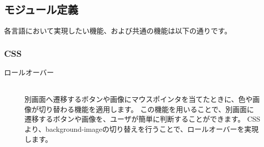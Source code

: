 \documentclass[a4j,titlepage]{jarticle}
\begin{document}
\clearpage

\subsection{モジュール定義}
各言語において実現したい機能、および共通の機能は以下の通りです。
\subsubsection{CSS}
\begin{description}
\item[ロールオーバー]~\\
別画面へ遷移するボタンや画像にマウスポインタを当てたときに、色や画像が切り替わる機能を適用します。
この機能を用いることで、別画面に遷移するボタンや画像を、ユーザが簡単に判断することができます。
CSSより、background-imageの切り替えを行うことで、ロールオーバーを実現します。
\end{description}
\end{document}
